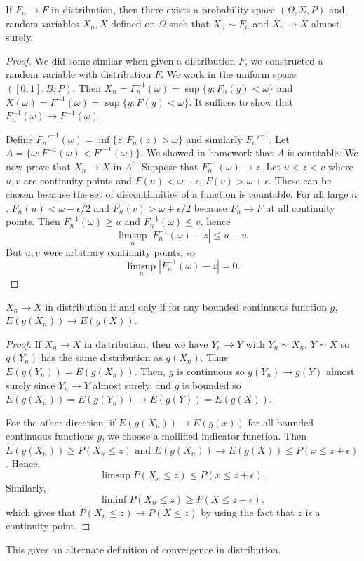 \documentclass[11pt]{scrartcl}
\begin{document}
\begin{thm} If $F_n \rightarrow F$ in distribution, then there exists a probability space $(\Omega, \Sigma, P)$ and random variables $X_n, X$ defined on $\Omega$ such that $X_n \sim F_n$ and $X_n \rightarrow X$ almost surely.
\end{thm}
\begin{proof}
We did some similar when given a distribution $F$, we constructed a random variable with distribution $F$.  We work in the uniform space $([0, 1], B, P)$.  Then $X_n = F_n^{-1}(\omega) = \sup\{y : F_n(y) < \omega\}$ and $X(\omega) = F^{-1}(\omega) = \sup\{y : F(y) < \omega\}$.  It suffices to show that $F_n^{-1}(\omega) \rightarrow F^{-1}(\omega)$.

Define $F_n'^{-1}(\omega) = \inf \{z : F_n(z) > \omega\}$ and similarly $F_n'^{-1}$. Let $A = \{\omega: F^{-1}(\omega) < F'^{-1}(\omega)\}$.  We showed in homework that $A$ is countable.  We now prove that $X_n \rightarrow X$ in $A^c$.  Suppose that $F_n^{-1}(\omega) \rightarrow z$.  Let $u < z < v$ where $u, v$ are continuity points and $F(u) < \omega - \epsilon$, $F(v) > \omega + \epsilon$.  These can be chosen because the set of discontinuities of a function is countable.  For all large $n$, $F_n(u) < \omega - \epsilon/2$ and $F_n(v) > \omega + \epsilon/2$ because $F_n \rightarrow F$ at all continuity points.  Then $F_n^{-1}(\omega) \ge u$ and $F_n^{-1}(\omega) \le v$, hence $$\limsup_n |F_n^{-1}(\omega) - z| \le u-v.$$
But $u, v$ were arbitrary continuity points, so $$\limsup_n |F_n^{-1}(\omega) - z|  = 0.$$
\end{proof}
\begin{fact} $X_n \rightarrow X$ in distribution if and only if for any bounded continuous function $g$, $E(g(X_n)) \rightarrow E(g(X))$.
\end{fact}
\begin{proof}
If $X_n \rightarrow X$ in distribution, then we have $Y_n \rightarrow Y$ with $Y_n \sim X_n$, $Y \sim X$ so $g(Y_n)$ has the same distribution as $g(X_n)$.  Thus $E(g(Y_n)) = E(g(X_n))$.  Then, $g$ is continuous so $g(Y_n) \rightarrow g(Y)$ almost surely since $Y_n \rightarrow Y$ almost surely, and $g$ is bounded so $E(g(X_n)) = E(g(Y_n)) \rightarrow E(g(Y)) = E(g(X))$.

For the other direction, if $E(g(X_n)) \rightarrow E(g(x))$ for all bounded continuous functions $g$, we choose a mollified indicator function.  Then $E(g(X_n)) \ge P(X_n \le z) $ and $E(g(X_n)) \rightarrow E(g(X)) \le P(x \le z + \epsilon)$.  Hence,
$$\limsup P(X_n \le z) \le P(x \le z+\epsilon).$$
Similarly, 
$$\liminf P(X_n \le z) \ge P(X \le z - \epsilon),$$
which gives that $P(X_n \le z) \rightarrow P(X \le z)$ by using the fact that $z$ is a continuity point.
\end{proof}
This gives an alternate definition of convergence in distribution.
\end{document}
